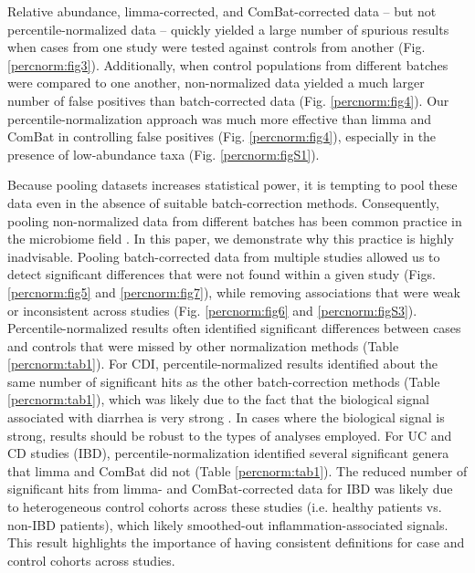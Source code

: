 Relative abundance, limma-corrected, and ComBat-corrected data -- but not percentile-normalized data -- quickly yielded a large number of spurious results when cases from one study were tested against controls from another (Fig. \ref{percnorm:fig3}).
Additionally, when control populations from different batches were compared to one another, non-normalized data yielded a much larger number of false positives than batch-corrected data (Fig. \ref{percnorm:fig4}).
Our percentile-normalization approach was much more effective than limma and ComBat in controlling false positives (Fig. \ref{percnorm:fig4}), especially in the presence of low-abundance taxa (Fig. \ref{percnorm:figS1}).

Because pooling datasets increases statistical power, it is tempting to pool these data even in the absence of suitable batch-correction methods.
Consequently, pooling non-normalized data from different batches has been common practice in the microbiome field \cite{27,29,35,47,48,49,50,51,52,53,54,55}.
In this paper, we demonstrate why this practice is highly inadvisable.
Pooling batch-corrected data from multiple studies allowed us to detect significant differences that were not found within a given study (Figs. \ref{percnorm:fig5} and \ref{percnorm:fig7}), while removing associations that were weak or inconsistent across studies (Fig. \ref{percnorm:fig6} and \ref{percnorm:figS3}).
Percentile-normalized results often identified significant differences between cases and controls that were missed by other normalization methods (Table \ref{percnorm:tab1}).
For CDI, percentile-normalized results identified about the same number of significant hits as the other batch-correction methods (Table \ref{percnorm:tab1}), which was likely due to the fact that the biological signal associated with diarrhea is very strong \cite{17}.
In cases where the biological signal is strong, results should be robust to the types of analyses employed.
For UC and CD studies (IBD), percentile-normalization identified several significant genera that limma and ComBat did not (Table \ref{percnorm:tab1}).
The reduced number of significant hits from limma- and ComBat-corrected data for IBD was likely due to heterogeneous control cohorts across these studies (i.e. healthy patients vs. non-IBD patients), which likely smoothed-out inflammation-associated signals.
This result highlights the importance of having consistent definitions for case and control cohorts across studies.

